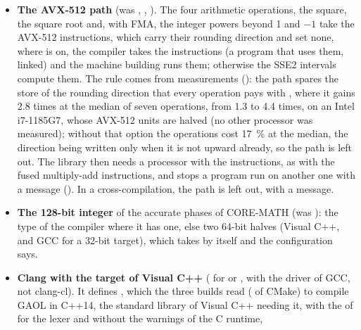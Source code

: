 \documentclass[12pt,a4paper,twoside,openright]{book}
\begin{document}
\begin{itemize}
  CORE-MATH and the exact products of GAOL call the  of the
  system library, and the integer powers beyond 1 and $-1$ do not take the
  packed kernel that uses the instruction; a build for x86\_64 alone
  () takes  where the
  machine building runs a program compiled with it.
%
\item[$\bullet$] \textbf{The AVX-512 path} (was
  , ,
  ). The four arithmetic operations, the square,
  the square root and, with FMA, the integer powers beyond 1 and $-1$ take
  the AVX-512 instructions, which carry their rounding direction and set
  none, where  is on, the compiler takes the
  instructions (a program that uses them, linked) and the machine building
  runs them; otherwise the SSE2 intervals compute them. The rule comes from
  measurements (): the path spares the store of the
  rounding direction that every operation pays with
  , where it gains 2.8 times at the median
  of seven operations, from 1.3 to 4.4 times, on an Intel i7-1185G7, whose
  AVX-512 units are halved (no other processor was measured); without that
  option the operations cost 17~\% at the median, the direction being written
  only when it is not upward already, so the path is left out. The library
  then needs a processor with the instructions, as with the fused
  multiply-add instructions, and  stops a program run on
  another one with a message (). In a cross-compilation,
  the path is left out, with a message.
%
\item[$\bullet$] \textbf{The 128-bit integer} of the accurate phases of
  CORE-MATH (was ): the type of the compiler
  where it has one, else two 64-bit halves (Visual C++, and GCC for a 32-bit
  target), which  takes by itself and the
  configuration says.
\item[$\bullet$] \textbf{Clang with the target of Visual C++}
  ( for  or
  , with the driver of GCC, not clang-cl). It
  defines , which the three builds read
  ( of CMake) to compile GAOL in C++14, the
  standard library of Visual C++ needing it, with the  of
   for the lexer and without the warnings of the C runtime,

\end{itemize}
\end{document}
